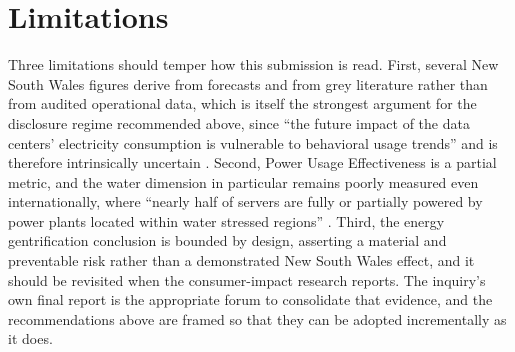 \section{Limitations}
\label{sec:supp:syn:limits}

Three limitations should temper how this submission is read. First, several New South Wales figures derive from forecasts and from grey literature rather than from audited operational data, which is itself the strongest argument for the disclosure regime recommended above, since \enquote{the future impact of the data centers' electricity consumption is vulnerable to behavioral usage trends} and is therefore intrinsically uncertain \autocite{kootUsageImpactData2021}. Second, Power Usage Effectiveness is a partial metric, and the water dimension in particular remains poorly measured even internationally, where \enquote{nearly half of servers are fully or partially powered by power plants located within water stressed regions} \autocite{siddikEnvironmentalFootprintData2021a}. Third, the energy gentrification conclusion is bounded by design, asserting a material and preventable risk rather than a demonstrated New South Wales effect, and it should be revisited when the consumer-impact research reports. The inquiry's own final report is the appropriate forum to consolidate that evidence, and the recommendations above are framed so that they can be adopted incrementally as it does.
